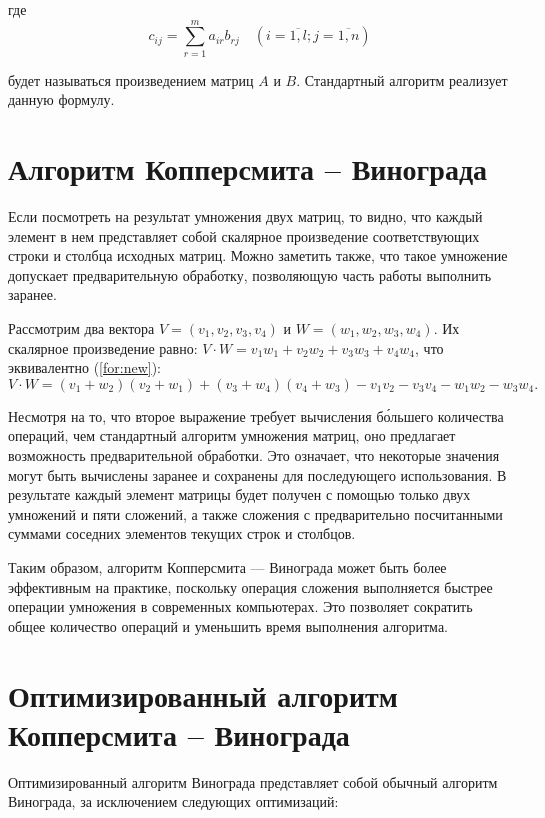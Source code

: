 где
\begin{equation}
	\label{eq:M}
	c_{ij} =
	\sum_{r=1}^{m} a_{ir}b_{rj} \quad (i=\overline{1,l}; j=\overline{1,n})
\end{equation}

будет называться произведением матриц $A$ и $B$.
Стандартный алгоритм реализует данную формулу.

\section{Алгоритм Копперсмита -- Винограда}

Если посмотреть на результат умножения двух матриц, то видно, что каждый элемент в нем представляет собой скалярное произведение соответствующих строки и столбца исходных матриц.
Можно заметить также, что такое умножение допускает предварительную обработку, позволяющую часть работы выполнить заранее.

Рассмотрим два вектора $V = (v_1, v_2, v_3, v_4)$ и $W = (w_1, w_2, w_3, w_4)$.
Их скалярное произведение равно: $V \cdot W = v_1w_1 + v_2w_2 + v_3w_3 + v_4w_4$, что эквивалентно (\ref{for:new}):
\begin{equation}
	\label{for:new}
	V \cdot W = (v_1 + w_2)(v_2 + w_1) + (v_3 + w_4)(v_4 + w_3) - v_1v_2 - v_3v_4 - w_1w_2 - w_3w_4.
\end{equation}

Несмотря на то, что второе выражение требует вычисления б\'{о}льшего количества операций, чем стандартный алгоритм умножения матриц, оно предлагает возможность предварительной обработки. Это означает, что некоторые значения могут быть вычислены заранее и сохранены для последующего использования. В результате каждый элемент матрицы будет получен с помощью только двух умножений и пяти сложений, а также сложения с предварительно посчитанными суммами соседних элементов текущих строк и столбцов.


Таким образом, алгоритм Копперсмита — Винограда может быть более эффективным на практике, поскольку операция сложения выполняется быстрее операции умножения в современных компьютерах. Это позволяет сократить общее количество операций и уменьшить время выполнения алгоритма.

\section{Оптимизированный алгоритм Копперсмита -- Винограда}

Оптимизированный алгоритм Винограда представляет собой обычный алгоритм Винограда, за исключением следующих оптимизаций:


